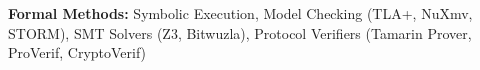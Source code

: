 \textbf{Formal Methods:} Symbolic Execution, Model Checking (TLA+, NuXmv, STORM), SMT Solvers (Z3, Bitwuzla), Protocol Verifiers (Tamarin Prover, ProVerif, CryptoVerif)

